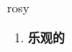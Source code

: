 
\begin{frame}
{\huge rosy}
\begin{center}
\begin{enumerate}\Large
  \item \textbf{乐观的}
\end{enumerate}
\end{center}
\end{frame}
